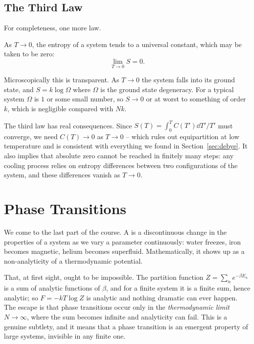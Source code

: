 \documentclass[a4paper]{scrartcl}
\begin{document}
\subsection{The Third Law}

For completeness, one more law.

\begin{law}
	As $T \to 0$, the entropy of a system tends to a universal constant, which may be taken to be zero:
	$$
	\lim_{T\to 0}S = 0.
	$$
\end{law}

Microscopically this is transparent. As $T \to 0$ the system falls into its ground state, and $S = k\log\Omega$ where $\Omega$ is the ground state degeneracy. For a typical system $\Omega$ is $1$ or some small number, so $S \to 0$ or at worst to something of order $k$, which is negligible compared with $Nk$.

The third law has real consequences. Since $S(T) = \int_0^T C(T')\dd T'/T'$ must converge, we need $C(T) \to 0$ as $T \to 0$ -- which rules out equipartition at low temperature and is consistent with everything we found in Section~\ref{sec:debye}. It also implies that absolute zero cannot be reached in finitely many steps: any cooling process relies on entropy differences between two configurations of the system, and these differences vanish as $T\to0$.

\section{Phase Transitions}

We come to the last part of the course. A  is a discontinuous change in the properties of a system as we vary a parameter continuously: water freezes, iron becomes magnetic, helium becomes superfluid. Mathematically, it shows up as a non-analyticity of a thermodynamic potential.

That, at first sight, ought to be impossible. The partition function $Z = \sum_n e^{-\beta E_n}$ is a sum of analytic functions of $\beta$, and for a finite system it is a finite sum, hence analytic; so $F = -kT\log Z$ is analytic and nothing dramatic can ever happen. The escape is that phase transitions occur only in the \emph{thermodynamic limit} $N \to \infty$, where the sum becomes infinite and analyticity can fail. This is a genuine subtlety, and it means that a phase transition is an emergent property of large systems, invisible in any finite one.
\end{document}
